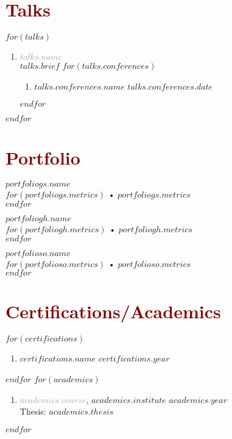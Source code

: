 \documentclass[$fontsize$, a4paper]{article}
\begin{document}
\section*{\textcolor{Maroon}{Talks}}
$for(talks)$
  \begin{enumerate}
    [topsep=10pt,itemsep=0pt,parsep=0pt,partopsep=0pt,leftmargin=10pt,label=•]
    \item{\textcolor{darkgray}{\textbf{$talks.name$}}\\$talks.brief$}
    $for(talks.conferences)$
    \begin{enumerate}
      [topsep=0pt,itemsep=0pt,parsep=0pt,partopsep=0pt,leftmargin=10pt,label=•]
      \item{\href{$talks.conferences.url$}{$talks.conferences.name$} \hfill $talks.conferences.date$}
    \end{enumerate}
    $endfor$
  \end{enumerate}
$endfor$

\section*{\textcolor{Maroon}{Portfolio}}
\begin{multicols}{3}
  \textcolor{darkgray}{} \href{$portfoliogs.url$}{$portfoliogs.name$}\\
  $for(portfoliogs.metrics)$
    • $portfoliogs.metrics$\\
  $endfor$

\columnbreak
  \textcolor{darkgray}{} \href{$portfoliogh.url$}{$portfoliogh.name$}\\
  $for(portfoliogh.metrics)$
    • $portfoliogh.metrics$\\
  $endfor$

\columnbreak
  \textcolor{darkgray}{} \href{$portfolioso.url$}{$portfolioso.name$}\\
  $for(portfolioso.metrics)$
    • $portfolioso.metrics$\\
  $endfor$
\end{multicols}

\section*{\textcolor{Maroon}{Certifications/Academics}}
$for(certifications)$
  \begin{enumerate}
    [topsep=0pt,itemsep=0pt,parsep=0pt,partopsep=0pt,leftmargin=10pt,label=•]
    \item{\href{$certifications.url$}{$certifications.name$} \hfill $certifications.year$}
  \end{enumerate}
$endfor$
\vspace*{\fill}
$for(academics)$
  \begin{enumerate}
    [topsep=0pt,itemsep=0pt,parsep=0pt,partopsep=0pt,leftmargin=10pt,label=•]
    \item{\textcolor{darkgray}{\textbf{$academics.course$}}, \textbf{\href{$academics.url$}{$academics.institute$}} \hfill $academics.year$\\Thesis: \href{$academics.thesis_url$}{$academics.thesis$}}
  \end{enumerate}
$endfor$
\end{document}
